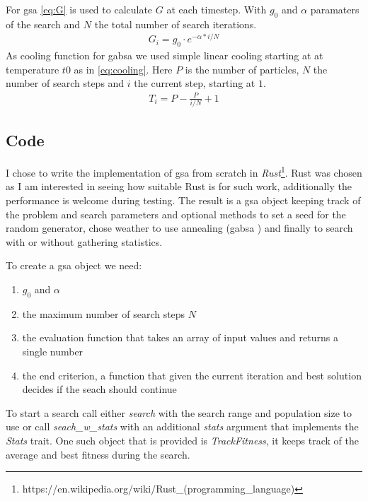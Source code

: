 For \ac{gsa} \cref{eq:G} is used to calculate $G$ at each timestep. With $g_0$ and $\alpha$ paramaters of the search and $N$ the total number of search iterations.
%
\begin{align} \label{eq:G}
	G_i = g_0 \cdot e^{- \alpha * i/N}
\end{align}
%
As cooling function for \ac{gabsa} we used simple linear cooling starting at at temperature $t0$ as in \cref{eq:cooling}. Here $P$ is the number of particles, $N$ the number of search steps and $i$ the current step, starting at $1$.
%
\begin{align} \label{eq:cooling}
	T_i = P - \frac{P}{i/N} + 1
\end{align}
%
\subsection{Code}
I chose to write the implementation of \ac{gsa} from scratch in \textit{Rust}\footnote{https://en.wikipedia.org/wiki/Rust\_(programming\_language)}. Rust was chosen as I am interested in seeing how suitable Rust is for such work, additionally the performance is welcome during testing. The result is a \ac{gsa} object keeping track of the problem and search parameters and optional methods to set a seed for the random generator, chose weather to use annealing (\ac{gabsa} ) and finally to search with or without gathering statistics.

To create a \ac{gsa} object we need:
%
\begin{enumerate}
\item $g_0$ and $\alpha$
\item the maximum number of search steps $N$
\item the evaluation function that takes an array of input values and returns a single number
\item the end criterion, a function that given the current iteration and best solution decides if the seach should continue
\end{enumerate}
%
To start a search call either \textit{search} with the search range and population size to use or call \textit{seach\_w\_stats} with an additional \textit{stats} argument that implements the \textit{Stats} trait. One such object that is provided is \textit{TrackFitness}, it keeps track of the average and best fitness during the search.
